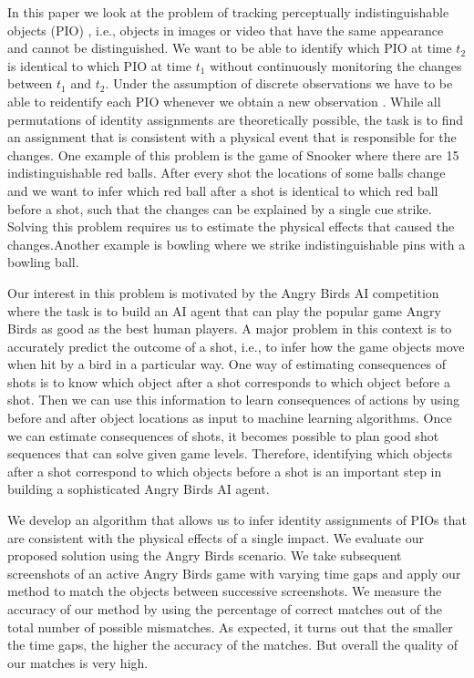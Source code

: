 \documentclass[letterpaper]{article}
\begin{document}
In this paper we look at the problem of tracking perceptually indistinguishable objects (PIO) \cite{santore2005identifying}, i.e., objects in images or video that have the same appearance and cannot be distinguished. We want to be able to identify which PIO at time $t_2$ is identical to which PIO at time $t_1$ without continuously monitoring the changes between $t_1$ and $t_2$. Under the assumption of discrete observations we have to be able to reidentify each PIO whenever we obtain a new observation \cite{pollock74}. While all permutations of identity assignments are theoretically possible, the task is to find an assignment that is consistent with a physical event that is responsible for the changes.
One example of this problem is the game of Snooker where there are 15 indistinguishable red balls. After every shot the locations of some balls change and we want to infer which red ball after a shot is identical to which red ball before a shot, such that the changes can be explained by a single cue strike. Solving this problem requires us to estimate the physical effects that caused the changes.Another example is bowling where we strike indistinguishable pins with a bowling ball.

Our interest in this problem is motivated by the Angry Birds AI competition \cite{abCompetition} where the task is to build an AI agent that can play the popular game Angry Birds as good as the best human players. A major problem in this context is to accurately predict the outcome of a shot, i.e., to infer how the game objects move when hit by a bird in a particular way. One way of estimating consequences of shots is to know which object after a shot corresponds to which object before a shot. Then we can use this information to learn consequences of actions by using before and after object locations as input to machine learning algorithms. Once we can estimate consequences of shots, it becomes possible to plan good shot sequences that can solve given game levels. Therefore, identifying which objects after a shot correspond to which objects before a shot is an important step in building a sophisticated Angry Birds AI agent.

We develop an algorithm that allows us to infer identity assignments of PIOs that are consistent with the physical effects of a single impact. We evaluate our proposed solution using the Angry Birds scenario. We take subsequent screenshots of an active Angry Birds game with varying time gaps and apply our method to match the objects between successive screenshots. We measure the accuracy of our method by using the percentage of correct matches out of the total number of possible mismatches. As expected, it turns out that the smaller the time gaps, the higher the accuracy of the matches. But overall the quality of our matches is very high.
\end{document}
